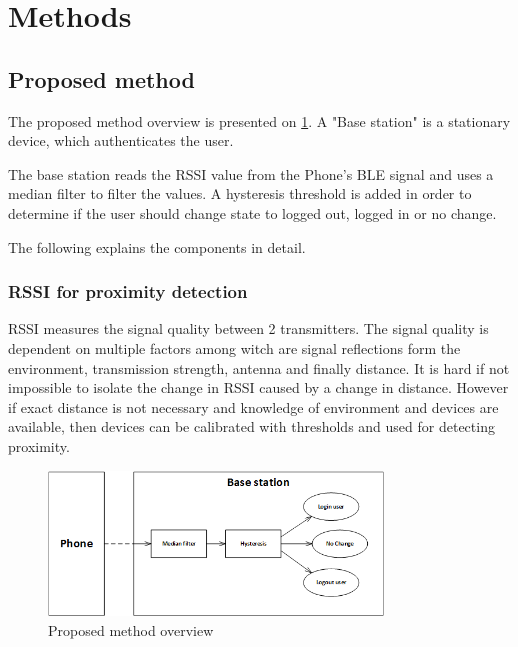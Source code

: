 \section{Methods}


\subsection{Proposed method}

The proposed method overview is presented on \cref{fig_solution_overview}. A "Base station" is a stationary device, which authenticates the user.

The base station reads the RSSI value from the Phone's BLE signal and uses a median filter to filter the values. A hysteresis threshold is added in order to determine if the user should change state to logged out, logged in or no change.

The following explains the components in detail.

\subsubsection{RSSI for proximity detection}

RSSI measures the signal quality between 2 transmitters.
The signal quality is dependent on multiple factors among witch are signal reflections form the environment, transmission strength, antenna and finally distance\cite{ref:rssidistance}. 
It is hard if not impossible to isolate the change in RSSI caused by a change in distance.
However if exact distance is not necessary and knowledge of environment and devices are available, then devices can be calibrated with thresholds and used for detecting proximity.


\begin{figure}[!t]
	\centering
	\includegraphics[width=3.5in]{img/SolutionOverview}
	\caption{ Proposed method overview }
	\label{fig_solution_overview}
\end{figure}

